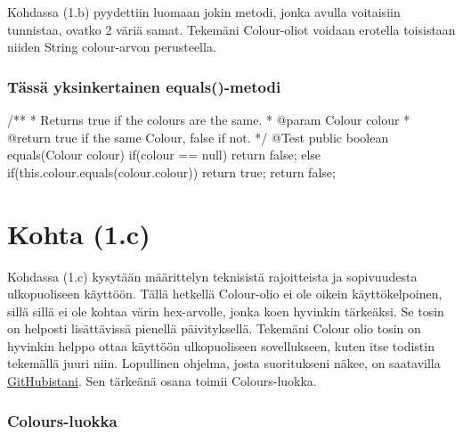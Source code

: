 \label{Kohta (1.b)}

Kohdassa (1.b) pyydettiin luomaan jokin metodi, jonka avulla voitaisiin tunnistaa, ovatko 2 väriä samat. Tekemäni Colour-oliot voidaan erotella toisistaan niiden String colour-arvon perusteella.

\subsubsection{Tässä yksinkertainen equals()-metodi}

\label{Tässä yksinkertainen equals()-metodi}
\begin{javacode}
/**
 * Returns true if the colours are the same.
 * @param Colour colour
 * @return true if the same Colour, false if not.
 */
@Test
public boolean equals(Colour colour) {
	if(colour == null) {
		return false;
	}
	else if(this.colour.equals(colour.colour))
		return true;
	return false;
}
\end{javacode}

\section{Kohta (1.c)}

\label{Kohta (1.c)}

Kohdassa (1.c) kysytään määrittelyn teknisistä rajoitteista ja sopivuudesta ulkopuoliseen käyttöön. Tällä hetkellä Colour-olio ei ole oikein käyttökelpoinen, sillä sillä ei ole kohtaa värin hex-arvolle, jonka koen hyvinkin tärkeäksi. Se tosin on helposti lisättävissä pienellä päivityksellä. Tekemäni Colour olio tosin on hyvinkin helppo ottaa käyttöön ulkopuoliseen sovellukseen, kuten itse todistin tekemällä juuri niin. Lopullinen ohjelma, josta suoritukseni näkee, on saatavilla \href{https://github.com/Santtinen/oomharj1}{GitHubistani}. Sen tärkeänä osana toimii Colours-luokka.

\subsubsection{Colours-luokka}

